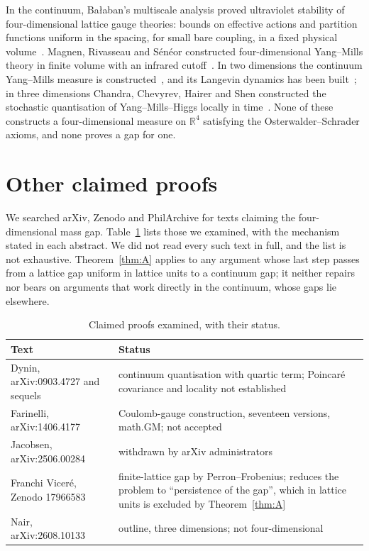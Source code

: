 \documentclass[aps,prd,twocolumn,superscriptaddress,nofootinbib,floatfix]{revtex4-2}
\theoremstyle{definition}
\theoremstyle{remark}
\newcommand{\R}{\mathbb{R}}
\begin{document}
In the continuum, Ba{\l}aban's multiscale analysis proved ultraviolet
stability of four-dimensional lattice gauge theories: bounds on effective
actions and partition functions uniform in the spacing, for small bare
coupling, in a fixed physical volume~\cite{Bal87,Bal88}. Magnen,
Rivasseau and S\'en\'eor constructed four-dimensional Yang--Mills theory in
finite volume with an infrared cutoff~\cite{MRS93}. In two dimensions the
continuum Yang--Mills measure is constructed~\cite{Lev03}, and its Langevin
dynamics has been built~\cite{CCHS22}; in three dimensions Chandra,
Chevyrev, Hairer and Shen constructed the stochastic quantisation of
Yang--Mills--Higgs locally in time~\cite{CCHS24}. None of these constructs a
four-dimensional measure on $\R^4$ satisfying the Osterwalder--Schrader
axioms, and none proves a gap for one.

\section{Other claimed proofs}
\label{sec:claims}

We searched arXiv, Zenodo and PhilArchive for texts claiming the
four-dimensional mass gap. Table~\ref{tab:claims} lists those we examined,
with the mechanism stated in each abstract. We did not read every such
text in full, and the list is not exhaustive. Theorem~\ref{thm:A} applies to
any argument whose last step passes from a lattice gap uniform in lattice
units to a continuum gap; it neither repairs nor bears on arguments that
work directly in the continuum, whose gaps lie elsewhere.

\begin{table}[t]
\caption{Claimed proofs examined, with their status.}
\label{tab:claims}
\begin{ruledtabular}
\begin{tabular}{>{\raggedright\arraybackslash}p{}>{\raggedright\arraybackslash}p{}}
Text & Status\\
\hline
Dynin, arXiv:0903.4727 and sequels & continuum quantisation with quartic
term; Poincar\'e covariance and locality not established~\cite{Dyn09}\\
Farinelli, arXiv:1406.4177 & Coulomb-gauge construction, seventeen
versions, math.GM; not accepted~\cite{Far14}\\
Jacobsen, arXiv:2506.00284 & withdrawn by arXiv administrators~\cite{Jac25}\\
Franchi Vicer\'e, Zenodo 17966583 & finite-lattice gap by
Perron--Frobenius; reduces the problem to ``persistence of the gap'', which
in lattice units is excluded by Theorem~\ref{thm:A}~\cite{FV25}\\
Nair, arXiv:2608.10133 & outline, three dimensions; not
four-dimensional~\cite{Nai26}\\
\end{tabular}
\end{ruledtabular}
\end{table}
\end{document}
